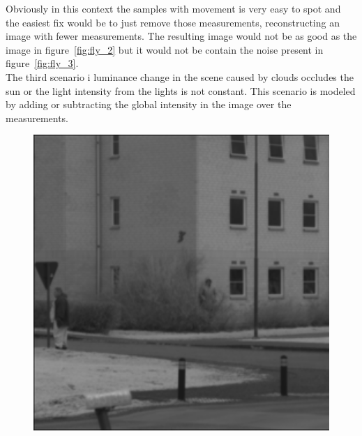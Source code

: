 Obviously in this context the samples with movement is very easy to spot and the easiest fix would be to just remove those measurements, reconstructing an image with fewer measurements. The resulting image would not be as good as the image in figure~\ref{fig:fly_2} but it would not be contain the noise present in figure~\ref{fig:fly_3}.\\[0.1in]




The third scenario i luminance change in the scene caused by clouds occludes the sun or the light intensity from the lights is not constant. This scenario is modeled by adding or subtracting the global intensity in the image over the measurements. 

\begin{figure}[H]
    \centering
\begin{minipage}[t]{0.245\textwidth}
    \includegraphics[width=1\textwidth]{result/dynamic/lum/intense_change_org.png}
    \label{fig:lum_1}
\end{minipage}
\begin{minipage}[t]{0.245\textwidth}

\end{minipage}
\end{figure}
